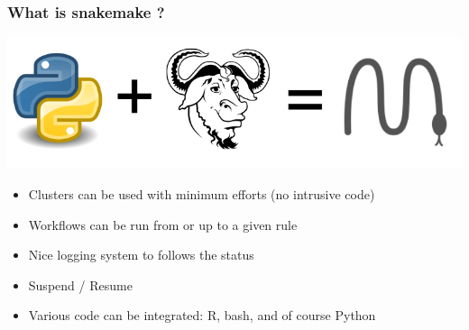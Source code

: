 \documentclass{beamer}
\begin{document}
\begin{frame}
  \frametitle{What is snakemake ?}
  \includegraphics[scale=0.45]{images/equation.png} 
  \begin{itemize}
    \item  Clusters can be used with minimum efforts (no intrusive code)
    \item  Workflows can be run from or up to a given rule
    \item  Nice logging system to follows the status
    \item  Suspend /  Resume 
    \item  Various code can be integrated: R, bash, and of course Python
  \end{itemize}
\end{frame}
\end{document}
